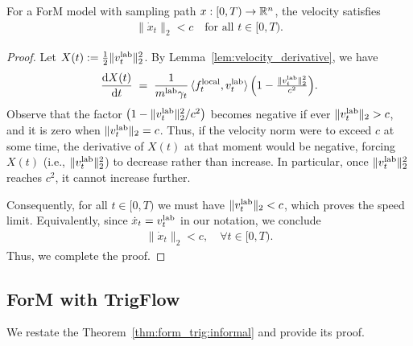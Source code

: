 \begin{theorem} \label{thm:vel:formal}
For a ForM model with sampling path $x : [0,T) \to \mathbb{R}^n$, the velocity satisfies
\begin{align*}
\| \dot{x}_t \|_2 < c \quad \text{for all } t \in [0,T).
\end{align*}
\end{theorem}
\begin{proof}
Let $X(t) := \tfrac12 \|v_t^{\rm lab}\|_2^2$. By Lemma~\ref{lem:velocity_derivative}, we have
    \begin{align*}
        \frac{\mathrm{d} X(t)}{\mathrm{d} t} 
        \;=\; \frac{1}{m^{\rm lab} \gamma_t}
        \,\langle f_t^{\rm local}, v_t^{\rm lab} \rangle
        \,\Bigl(1 - \tfrac{\|v_t^{\rm lab}\|_2^2}{c^2}\Bigr).
    \end{align*}
    Observe that the factor $\bigl(1 - \|v_t^{\rm lab}\|_2^2 / c^2 \bigr)$ becomes negative if ever $\|v_t^{\rm lab}\|_2 > c$, and it is zero when $\|v_t^{\rm lab}\|_2 = c$. Thus, if the velocity norm were to exceed $c$ at some time, the derivative of $X(t)$ at that moment would be negative, forcing $X(t)$ (i.e., $\|v_t^{\rm lab}\|_2^2$) to decrease rather than increase. In particular, once $\|v_t^{\rm lab}\|_2^2$ reaches $c^2$, it cannot increase further.

    Consequently, for all $t \in [0,T)$ we must have $\|v_t^{\rm lab}\|_2 < c$, which proves the speed limit. Equivalently, since $\dot{x}_t = v_t^{\rm lab}$ in our notation, we conclude
    \begin{align*}
        \|\dot{x}_t\|_2 < c,
        \quad \forall t \in [0,T).
    \end{align*}
    Thus, we complete the proof.
    \end{proof}

\subsection{ForM with TrigFlow} \label{sub:app:form_trig}

We restate the Theorem~\ref{thm:form_trig:informal} and provide its proof.


